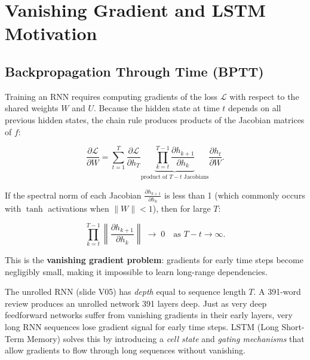 \documentclass[12pt,a4paper]{article}
\newcommand{\tanh}{\operatorname{tanh}}
\begin{document}
\section{Vanishing Gradient and LSTM Motivation}
\label{sec:lstm_motivation}

\subsection{Backpropagation Through Time (BPTT)}
\label{subsec:bptt}

Training an RNN requires computing gradients of the loss
$\mathcal{L}$ with respect to the shared weights $W$ and $U$.
Because the hidden state at time $t$ depends on all previous hidden
states, the chain rule produces products of the Jacobian matrices of
$f$:

\begin{equation}
  \frac{\partial \mathcal{L}}{\partial W}
    = \sum_{t=1}^{T} \frac{\partial \mathcal{L}}{\partial h_T}
      \underbrace{\prod_{k=t}^{T-1}
        \frac{\partial h_{k+1}}{\partial h_k}}_{\text{product of }T-t\text{ Jacobians}}
      \frac{\partial h_t}{\partial W}.
  \label{eq:bptt}
\end{equation}

If the spectral norm of each Jacobian $\tfrac{\partial h_{k+1}}{\partial h_k}$
is less than 1 (which commonly occurs with $\tanh$ activations when
$\|W\| < 1$), then for large $T$:

\begin{equation}
  \prod_{k=t}^{T-1} \left\| \frac{\partial h_{k+1}}{\partial h_k} \right\|
  \;\longrightarrow\; 0 \quad \text{as } T - t \to \infty.
  \label{eq:vanishing}
\end{equation}

This is the \textbf{vanishing gradient problem}: gradients for early
time steps become negligibly small, making it impossible to learn
long-range dependencies.

\begin{keyinsight}[title=Unrolled View Explains Vanishing Gradients]
  The unrolled RNN (slide V05) has \emph{depth} equal to sequence
  length $T$.  A 391-word review produces an unrolled network 391
  layers deep.  Just as very deep feedforward networks suffer from
  vanishing gradients in their early layers, very long RNN sequences
  lose gradient signal for early time steps.  LSTM (Long Short-Term
  Memory) solves this by introducing a \emph{cell state} and
  \emph{gating mechanisms} that allow gradients to flow through long
  sequences without vanishing.
\end{keyinsight}
\end{document}
